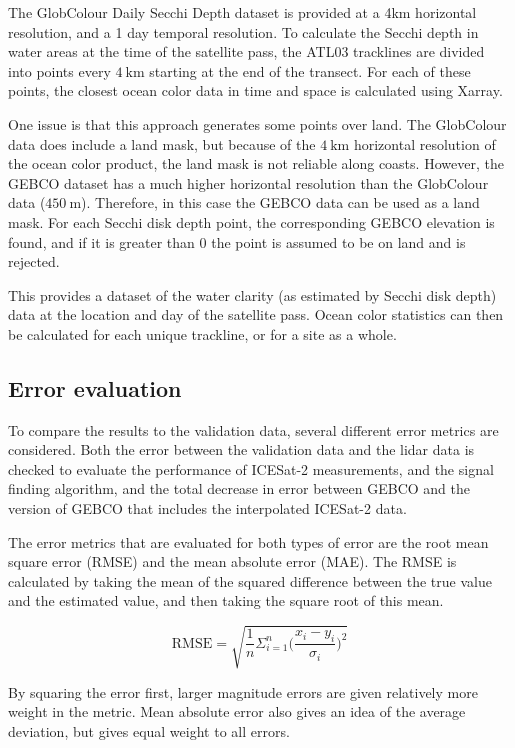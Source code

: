 The GlobColour Daily Secchi Depth dataset is provided at a 4km horizontal resolution, and a 1 day temporal resolution. To calculate the Secchi depth in water areas at the time of the satellite pass, the ATL03 tracklines are divided into points every $4~\text{km}$ starting at the end of the transect. For each of these points, the closest ocean color data in time and space is calculated using Xarray. 

One issue is that this approach generates some points over land. The GlobColour data does include a land mask, but because of the $4~\text{km}$ horizontal resolution of the ocean color product, the land mask is not reliable along coasts. However, the GEBCO dataset has a much higher horizontal resolution than the GlobColour data ($450~\text{m}$). Therefore, in this case the GEBCO data can be used as a land mask. For each Secchi disk depth point, the corresponding GEBCO elevation is found, and if it is greater than 0 the point is assumed to be on land and is rejected. 

This provides a dataset of the water clarity (as estimated by Secchi disk depth) data at the location and day of the satellite pass. Ocean color statistics can then be calculated for each unique trackline, or for a site as a whole.


\subsection{Error evaluation}

To compare the results to the validation data, several different error metrics are considered. Both the error between the validation data and the lidar data is checked to evaluate the performance of ICESat-2 measurements, and the signal finding algorithm, and the total decrease in error between GEBCO and the version of GEBCO that includes the interpolated ICESat-2 data. 

The error metrics that are evaluated for both types of error are the root mean square error (RMSE) and the mean absolute error (MAE). The RMSE is calculated by taking the mean of the squared difference between the true value and the estimated value, and then taking the square root of this mean.

$$  \text{RMSE} = \sqrt{\frac{1}{n}\Sigma_{i=1}^{n}{\Big(\frac{x_i - y_i}{\sigma_i}\Big)^2}}  $$

By squaring the error first, larger magnitude errors are given relatively more weight in the metric. Mean absolute error also gives an idea of the average deviation, but gives equal weight to all errors.

